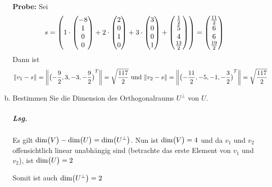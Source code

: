 \documentclass{scrreprt}
\begin{document}
\begin{enumerate}[(a)]
  \textbf{Probe:} Sei
  \[
    s = \qty(
      1 \cdot \begin{pmatrix}
        -8 \\
        1  \\
        0  \\
        0  \\
      \end{pmatrix} + 2 \cdot \begin{pmatrix}
        2 \\
        0 \\
        1 \\
        0 \\
      \end{pmatrix} + 3 \cdot \begin{pmatrix}
        3 \\
        0 \\
        0 \\
        1 \\
      \end{pmatrix} + \begin{pmatrix}
        \frac{1}{2} \\
        5           \\
        4           \\
        \frac{13}{2} \\
      \end{pmatrix}
      ) = \begin{pmatrix}
      \frac{11}{2} \\
      6            \\
      6            \\
      \frac{19}{2} \\
    \end{pmatrix}
  \]
  Dann ist
  \[
    \norm{v_1 - s} = \norm{\qty\big(-\frac{9}{2}, 3, -3, -\frac{9}{2})^T}
    = \sqrt{\frac{117}{2}}
    \text{ und }
    \norm{v_2 - s} = \norm{\qty\big(-\frac{11}{2}, -5, -1, -\frac{3}{2})^T}
    = \sqrt{\frac{117}{2}}
  \]

\item Bestimmen Sie die Dimension des Orthogonalraums $U^{\bot}$ von $U$.

  \subparagraph{Lsg.} Es gilt
  $\text{dim}\qty\big(V) - \text{dim}\qty\big(U) = \text{dim}\qty\big(U^{\bot})$.
  Nun ist $\text{dim}\qty\big(V) = 4$ und da $v_1$ und $v_2$ offensichtlich
  linear unabhängig sind (betrachte das erste Element von $v_1$ und $v_2$),
  ist $\text{dim}\qty\big(U) = 2$

  Somit ist auch $\text{dim}\qty\big(U^{\bot}) = 2$


\end{enumerate}
\end{document}
